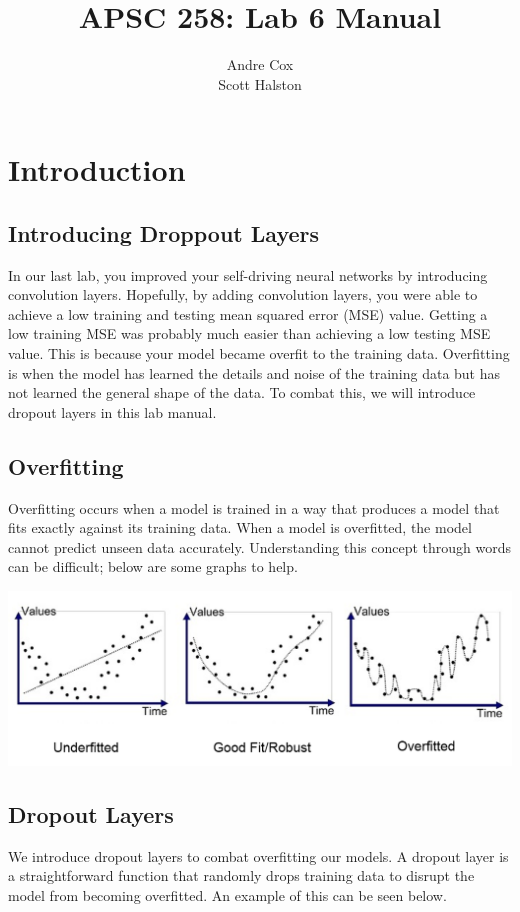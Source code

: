 \documentclass[11pt]{report}
\title{APSC 258: Lab 6 Manual}
\author{Andre Cox  \\ Scott Halston}
\begin{document}
\maketitle
\tableofcontents

\clearpage

\chapter{Introduction}
\section{Introducing Droppout Layers}
In our last lab, you improved your self-driving neural networks by introducing convolution layers. Hopefully, by adding convolution layers, you were able to achieve a low training and testing mean squared error (MSE) value. Getting a low training MSE was probably much easier than achieving a low testing MSE value. This is because your model became overfit to the training data. Overfitting is when the model has learned the details and noise of the training data but has not learned the general shape of the data. To combat this, we will introduce dropout layers in this lab manual.

\section{Overfitting}
Overfitting occurs when a model is trained in a way that produces a model that fits exactly against its training data. When a model is overfitted, the model cannot predict unseen data accurately. Understanding this concept through words can be difficult; below are some graphs to help.

\begin{center}
    \includegraphics[scale=0.325]{overfitexample.png}
\end{center}

\section{Dropout Layers}
We introduce dropout layers to combat overfitting our models. A dropout layer is a straightforward function that randomly drops training data to disrupt the model from becoming overfitted. An example of this can be seen below.
\end{document}
